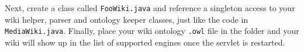 Next, create a class called \texttt{FooWiki.java} and reference a singleton access to your wiki helper, parser and ontology keeper classes, just like the code in \texttt{MediaWiki.java}. Finally, place your wiki ontology \texttt{.owl} file in the  folder and your wiki will show up in the list of supported engines once the servlet is restarted.
